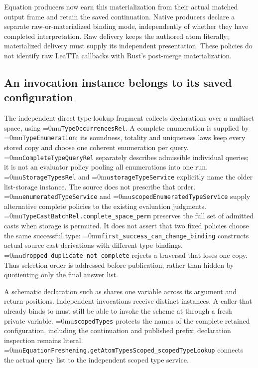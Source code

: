 \documentclass[11pt,a4paper]{article}
\newcommand{\code}[1]{\texttt{\detokenize{#1}}}
\newcommand{\name}[1]{\textup{\Urlmuskip=0mu\relax\nolinkurl{#1}}}
\begin{document}
Equation producers now earn this materialization from their actual matched
output frame and retain the saved continuation. Native producers declare a
separate raw-or-materialized binding mode, independently of whether they have
completed interpretation. Raw delivery keeps the authored atom literally;
materialized delivery must supply its independent presentation. These policies
do not identify raw LeaTTa callbacks with Rust's post-merge materialization.

\subsection*{An invocation instance belongs to its saved configuration}

The independent direct type-lookup fragment collects declarations over a
multiset space, using \name{TypeOccurrencesRel}. A complete enumeration is
supplied by \name{TypeEnumeration}; its soundness, totality and uniqueness laws
keep every stored copy and choose one coherent enumeration per query.
\name{CompleteTypeQueryRel} separately describes admissible individual queries;
it is not an evaluator policy pooling all enumerations into one run.
\name{StorageTypesRel} and \name{storageTypeService} explicitly
name the older list-storage instance. The source does not prescribe that order.
\name{enumeratedTypeService} and \name{scopedEnumeratedTypeService} supply
alternative complete policies to the existing evaluation judgments.
\name{TypeCastBatchRel.complete_space_perm} preserves the full set of admitted
casts when storage is permuted. It does not assert that two fixed policies
choose the same successful type: \name{first_success_can_change_binding}
constructs actual source cast derivations with different type bindings.
\name{dropped_duplicate_not_complete} rejects a traversal that loses one copy.
Thus selection order is addressed before publication, rather than hidden by
quotienting only the final answer list.

A schematic declaration such as \code{(-> $t $t)} shares one variable across
its argument and return positions. Independent invocations receive distinct
instances. A caller that already binds \code{$t} to \code{Number} must still
be able to invoke the scheme at \code{Bool} through a fresh private variable.
\name{scopedTypes} protects the names of the complete retained configuration,
including the continuation and published prefix; declaration inspection remains
literal. \name{EquationFreshening.getAtomTypesScoped_scopedTypeLookup} connects
the actual query list to the independent scoped type service.
\end{document}
